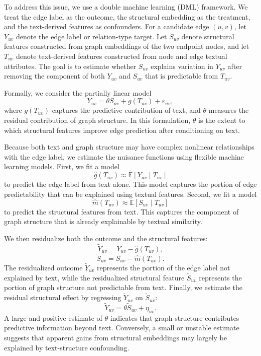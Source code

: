 \documentclass{article}
\theoremstyle{plain}
\theoremstyle{definition}
\theoremstyle{remark}
\begin{document}
To address this issue, we use a double machine learning (DML) framework. We treat the edge label as the outcome, the structural embedding as the treatment, and the text-derived features as confounders. For a candidate edge $(u,v)$, let $Y_{uv}$ denote the edge label or relation-type target. Let $S_{uv}$ denote structural features constructed from graph embeddings of the two endpoint nodes, and let $T_{uv}$ denote text-derived features constructed from node and edge textual attributes. The goal is to estimate whether $S_{uv}$ explains variation in $Y_{uv}$ after removing the component of both $Y_{uv}$ and $S_{uv}$ that is predictable from $T_{uv}$.

Formally, we consider the partially linear model
\[
Y_{uv} = \theta S_{uv} + g(T_{uv}) + \varepsilon_{uv},
\]
where $g(T_{uv})$ captures the predictive contribution of text, and $\theta$ measures the residual contribution of graph structure. In this formulation, $\theta$ is the extent to which structural features improve edge prediction after conditioning on text.

Because both text and graph structure may have complex nonlinear relationships with the edge label, we estimate the nuisance functions using flexible machine learning models. First, we fit a model
\[
\hat{g}(T_{uv}) \approx \mathbb{E}[Y_{uv} \mid T_{uv}]
\]
to predict the edge label from text alone. This model captures the portion of edge predictability that can be explained using textual features. Second, we fit a model
\[
\hat{m}(T_{uv}) \approx \mathbb{E}[S_{uv} \mid T_{uv}]
\]
to predict the structural features from text. This captures the component of graph structure that is already explainable by textual similarity.

We then residualize both the outcome and the structural features:
\[
\tilde{Y}_{uv} = Y_{uv} - \hat{g}(T_{uv}),
\]
\[
\tilde{S}_{uv} = S_{uv} - \hat{m}(T_{uv}).
\]
The residualized outcome $\tilde{Y}_{uv}$ represents the portion of the edge label not explained by text, while the residualized structural feature $\tilde{S}_{uv}$ represents the portion of graph structure not predictable from text. Finally, we estimate the residual structural effect by regressing $\tilde{Y}_{uv}$ on $\tilde{S}_{uv}$:
\[
\tilde{Y}_{uv} = \theta \tilde{S}_{uv} + \eta_{uv}.
\]
A large and positive estimate of $\theta$ indicates that graph structure contributes predictive information beyond text. Conversely, a small or unstable estimate suggests that apparent gains from structural embeddings may largely be explained by text-structure confounding.
\end{document}
